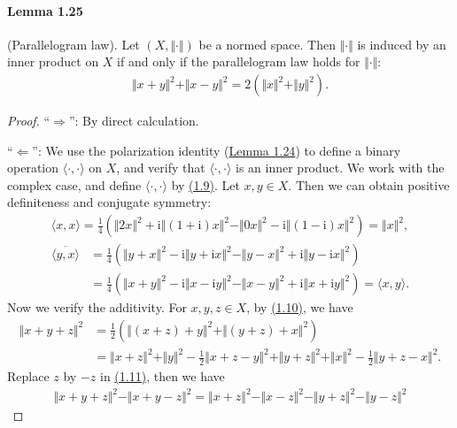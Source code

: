 \documentclass{article}
\renewcommand{\i}{\mathrm{i}}
\begin{document}
\paragraph{Lemma 1.25\label{lemma:1.25}} (Parallelogram law). Let $(X,\Vert\cdot\Vert)$ be a normed space. Then $\Vert\cdot\Vert$ is induced by an inner product on $X$ if and only if the parallelogram law holds for $\Vert\cdot\Vert$:
\begin{align*}
	\Vert x+y\Vert^2 + \Vert x-y\Vert^2 = 2\left(\Vert x\Vert^2 + \Vert y\Vert^2\right).\tag{1.10}\label{eq:1.10}
\end{align*}
\begin{proof}
``$\Rightarrow$'': By direct calculation.

``$\Leftarrow$'': We use the polarization identity (\hyperref[lemma:1.24]{Lemma 1.24}) to define a binary operation $\langle\cdot,\cdot\rangle$ on $X$, and verify that $\langle\cdot,\cdot\rangle$ is an inner product. We work with the complex case, and define $\langle\cdot,\cdot\rangle$ by \hyperref[eq:1.9]{(1.9)}. Let $x,y\in X$. Then we can obtain positive definiteness and conjugate symmetry:
\begin{align*}
	\langle x,x\rangle = \frac{1}{4}\left(\Vert 2x\Vert^2 + \i\Vert(1+\i)x\Vert^2 -\Vert 0x\Vert^2 - \i\Vert (1-\i)x\Vert^2 \right) = \Vert x\Vert^2,
\end{align*}
\begin{align*}
	\overline{\langle y,x\rangle} &= \frac{1}{4}\left(\Vert y+x\Vert^2 - \i\Vert y+\i x\Vert^2 - \Vert y-x\Vert^2 + \i\Vert y-\i x\Vert^2\right)\\
	&= \frac{1}{4}\left(\Vert x+y\Vert^2 - \i\Vert x-\i y\Vert^2 - \Vert x-y\Vert^2 + \i\Vert x +\i y\Vert^2\right) = \langle x,y\rangle.
\end{align*}
Now we verify the additivity. For $x,y,z\in X$, by \hyperref[eq:1.10]{(1.10)}, we have
\begin{align*}
	\Vert x+y+z\Vert^2 &= \frac{1}{2}\left(\Vert (x+z)+y\Vert^2 + \Vert (y+z)+x\Vert^2\right)\\
	&= \Vert x+z\Vert^2 + \Vert y\Vert^2 - \frac{1}{2}\Vert x+z-y\Vert^2 + \Vert y+z\Vert^2 + \Vert x\Vert^2 - \frac{1}{2}\Vert y+z-x\Vert^2.\tag{1.11}\label{eq:1.11}
\end{align*}
Replace $z$ by $-z$ in \hyperref[eq:1.11]{(1.11)}, then we have
\begin{align*}
	\Vert x+y+z\Vert^2 - \Vert x+y-z\Vert^2 = \Vert x+z\Vert^2 - \Vert x-z\Vert^2 - \Vert y+z\Vert^2 - \Vert y-z\Vert^2 \tag{1.12}\label{eq:1.12}
\end{align*}

\end{proof}
\end{document}
